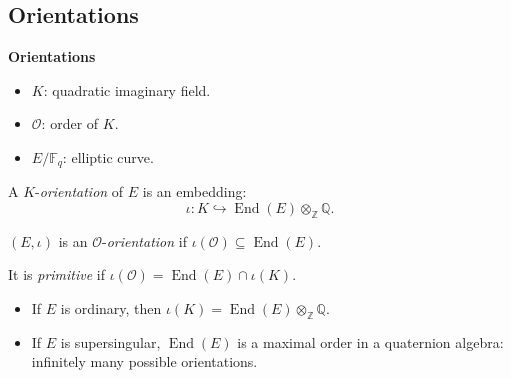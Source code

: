 \documentclass[10pt]{beamer}
\theoremstyle{plain}
\theoremstyle{definition}
\newcommand{\Z}{\mathbb{Z}}
\newcommand{\Q}{\mathbb{Q}}
\newcommand{\F}{\mathbb{F}}
\newcommand{\mO}{\mathcal{O}}
\renewcommand{\(}{\left(}
\renewcommand{\)}{\right)}
\DeclareMathOperator{\End}{End}
\begin{document}
\subsection{Orientations}

\begin{frame}

\textbf{Orientations}

\vspace{0.5cm}

\begin{itemize}
\item $K$: quadratic imaginary field.
\item $\mO$: order of $K$.
\item $E/\F_q$: elliptic curve.
\end{itemize}

\begin{definition}
A $K$-\emph{orientation} of $E$ is an embedding: 
\[\iota : K\hookrightarrow \End(E)\otimes_\Z\Q.\]

$(E, \iota)$ is an $\mO$-\emph{orientation} if $\iota(\mO)\subseteq \End(E)$.  

It is \emph{primitive} if $\iota(\mO)=\End(E)\cap\iota(K)$.
\end{definition}

\pause

\begin{itemize}
\item If $E$ is ordinary, then $\iota(K)=\End(E)\otimes_\Z\Q$. 

\pause
\item If $E$ is supersingular, $\End(E)$ is a maximal order in a quaternion algebra: infinitely many possible orientations.
\end{itemize}

\end{frame}
\end{document}
